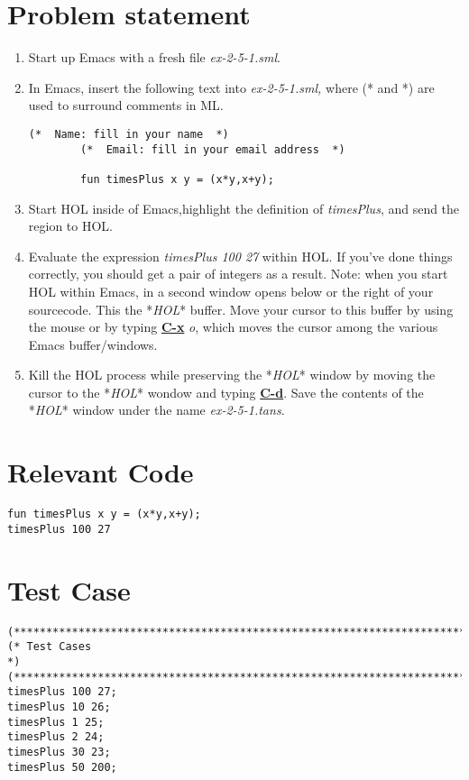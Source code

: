 \documentclass{report}
\begin{document}
\section{Problem statement}
\label{problem-statement-2}
\begin{enumerate}
	\item Start up Emacs with a fresh file \emph{ex-2-5-1.sml}.
	\item In Emacs, insert the following text into \emph{ex-2-5-1.sml,} where (* and *) are used to surround comments in ML.
	\begin{lstlisting}[frame=tblr]
		(*  Name: fill in your name  *)
		(*  Email: fill in your email address  *)
		
		fun timesPlus x y = (x*y,x+y);
	\end{lstlisting}
	\item Start HOL inside of Emacs,highlight the definition of \emph{timesPlus}, and send the region to HOL.
	\item Evaluate the expression \emph{timesPlus 100 27} within HOL. If you've done things correctly, you should get a pair of integers as a result. Note: when you start HOL within Emacs, in a second window opens below or the right of your sourcecode. This the *\emph{HOL}* buffer. Move your cursor to this buffer by using the mouse or by typing \textbf{\underline{C-x}} \emph{o}, which moves the cursor among the various Emacs buffer/windows.
	\item Kill the HOL process while preserving the *\emph{HOL}* window by moving the cursor to the *\emph{HOL}* wondow and typing \underline{\textbf{C-d}}. Save the contents of the *\emph{HOL}* window under the name \emph{ex-2-5-1.tans}.
\end{enumerate}

\section{Relevant Code}
\label{rel-code-2}
\begin{lstlisting}[frame=TB]
fun timesPlus x y = (x*y,x+y);
timesPlus 100 27
\end{lstlisting}

\section{Test Case}
\label{test-results-2}
\begin{lstlisting}[frame=TB]
(******************************************************************************)
(* Test Cases																  *)
(******************************************************************************)
timesPlus 100 27;
timesPlus 10 26;
timesPlus 1 25;
timesPlus 2 24;
timesPlus 30 23;
timesPlus 50 200;
\end{lstlisting}
\end{document}
